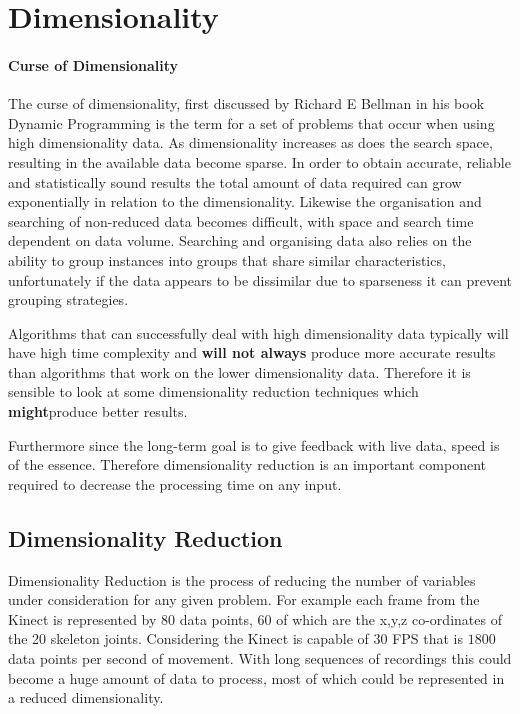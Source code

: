 \section{Dimensionality}
\paragraph{Curse of Dimensionality}
The curse of dimensionality, first discussed by Richard E Bellman in his book Dynamic Programming\cite{dynprog} is the term for a set of problems that occur when using high dimensionality data. As dimensionality increases as does the search space, resulting in the available data become sparse. In order to obtain accurate, reliable and statistically sound results the total amount of data required can grow exponentially in relation to the dimensionality. Likewise the organisation and searching of non-reduced data becomes difficult, with space and search time dependent on data volume. Searching and organising data also relies on the ability to group instances into groups that share similar characteristics, unfortunately if the data appears to be dissimilar due to sparseness it can prevent grouping strategies.

Algorithms that can successfully deal with high dimensionality data typically will have high time complexity and {\bf will not always} produce more accurate results than algorithms that work on the lower dimensionality data. Therefore it is sensible to look at some dimensionality reduction techniques which {\bf might}produce better results.

Furthermore since the long-term goal is to give feedback with live data, speed is of the essence. Therefore dimensionality reduction is an important component required to decrease the processing time on any input.

\subsection{Dimensionality Reduction}
Dimensionality Reduction is the process of reducing the number of variables under consideration for any given problem. For example each frame from the Kinect is represented by 80 data points, 60 of which are the x,y,z co-ordinates of the 20 skeleton joints. Considering the Kinect is capable of 30 FPS that is $1800$ data points per second of movement. With long sequences of recordings this could become a huge amount of data to process, most of which could be represented in a reduced dimensionality.

